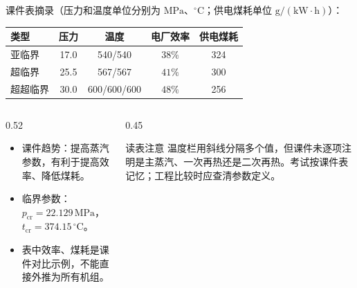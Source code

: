 \begin{frame}[t,shrink]{}
课件表摘录（压力和温度单位分别为 \(\mathrm{MPa}\)、\(\mathrm{^\circ C}\)；供电煤耗单位 \(\mathrm{g/(kW\cdot h)}\)）：
\begin{center}
\begin{tabularx}{0.92\linewidth}{@{}lcccc@{}}
  \toprule
  类型 & 压力 & 温度 & 电厂效率 & 供电煤耗\\
  \midrule
  亚临界 & 17.0 & 540/540 & \(38\%\) & 324\\
  超临界 & 25.5 & 567/567 & \(41\%\) & 300\\
  超超临界 & 30.0 & 600/600/600 & \(48\%\) & 256\\
  \bottomrule
\end{tabularx}
\end{center}
\begin{columns}[T,onlytextwidth]
\begin{column}{0.52\textwidth}
  \begin{itemize}
    \item 课件趋势：提高蒸汽参数，有利于提高效率、降低煤耗。
    \item 临界参数：\(p_{\mathrm{cr}}=22.129\,\mathrm{MPa}\)，\(t_{\mathrm{cr}}=374.15\,\mathrm{^\circ C}\)。
    \item 表中效率、煤耗是课件对比示例，不能直接外推为所有机组。
  \end{itemize}
\end{column}
\begin{column}{0.45\textwidth}
  \begin{amberbox}{读表注意}
  \small 温度栏用斜线分隔多个值，但课件未逐项注明是主蒸汽、一次再热还是二次再热。考试按课件表记忆；工程比较时应查清参数定义。
  \end{amberbox}
\end{column}
\end{columns}
\end{frame}

